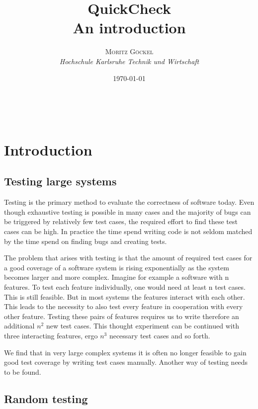 \documentclass[a4paper, 12pt]{article} %
\title{\textbf{QuickCheck}\\ %
An introduction} %
\author{\textsc{Moritz G\"ockel} %
\\{\textit{Hochschule Karlsruhe Technik und Wirtschaft}}} %
\date{\today}
\makeatletter
\renewcommand{\maketitle}{ 
\begin{flushright} %
{\LARGE\@title} %

\vspace{50pt} %

{\large\@author}
\\\@date 

\vspace{40pt}
\end{flushright}
}
\makeatother
\begin{document}
\maketitle

\vspace{30pt}

\newpage
\tableofcontents

\newpage
\section{Introduction}

\subsection{Testing large systems}

Testing is the primary method to evaluate the correctness of software today. \cite{Ammann2016} Even though exhaustive testing is possible in many cases and the majority of bugs can be triggered by relatively few test cases, \cite{Kuhn2004} the required effort to find these test cases can be high. In practice the time spend writing code is not seldom matched by the time spend on finding bugs and creating tests.

The problem that arises with testing is that the amount of required test cases for a good coverage of a software system is rising exponentially as the system becomes larger and more complex. Imagine for example a software with n features. To test each feature individually, one would need at least n test cases. This is still feasible. But in most systems the features interact with each other. This leads to the necessity to also test every feature in cooperation with every other feature. Testing these pairs of features requires us to write therefore an additional $n^2$  new test cases. This thought experiment can be continued with three interacting features, ergo $n^3$ necessary test cases and so forth. \cite{Hughes2016}

We find that in very large complex systems it is often no longer feasible to gain good test coverage by writing test cases manually. Another way of testing needs to be found. 

\subsection{Random testing}
\end{document}
